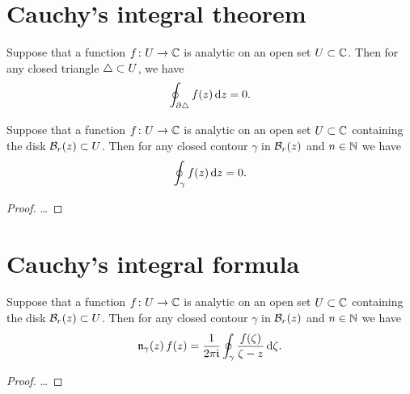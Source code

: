 \section{Cauchy's integral theorem}

\begin{lemma}
  \label{lem:goursat}
  Suppose that a function $f \colon U \to \mathbb{C}$ is analytic on an open
  set $U \subset \mathbb{C}$.
  Then for any closed triangle $\triangle \subset U$, we have
  \begin{align*}
    \oint_{\partial \triangle} f(z) \, \mathrm{d} z = 0 .
  \end{align*}
\end{lemma}

\begin{theorem}
  \label{thm:cauchy_theorem}
  Suppose that a function $f \colon U \to \mathbb{C}$ is analytic on an open
  set $U \subset \mathbb{C}$ containing the disk $\mathcal{B}_{{r}}(z) \subset U$.
  Then for any closed contour $\gamma$ in $\mathcal{B}_{{r}}(z)$
  and $n \in \mathbb{N}$ we have
  \begin{align*}
    \oint_\gamma f(z) \, \mathrm{d} z = 0 .
  \end{align*}
\end{theorem}
\begin{proof}
  \ldots
\end{proof}



\section{Cauchy's integral formula}


\begin{theorem}
  \label{thm:cauchy_formula}
  Suppose that a function $f \colon U \to \mathbb{C}$ is analytic on an open
  set $U \subset \mathbb{C}$ containing the disk $\mathcal{B}_{{r}}(z) \subset U$.
  Then for any closed contour $\gamma$ in $\mathcal{B}_{{r}}(z)$
  and $n \in \mathbb{N}$ we have
  \begin{align*}
    \mathfrak{n}_{{\gamma}}(z) \, f(z)
      = \frac{1}{2\pi \mathfrak{i}} \oint_\gamma \frac{f(\zeta)}{\zeta - z} \, \mathrm{d} \zeta .
  \end{align*}
\end{theorem}
\begin{proof}
  \ldots
\end{proof}
